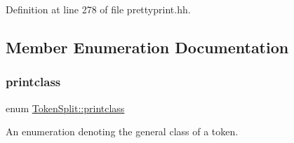Definition at line 278 of file prettyprint.\+hh.



\subsection{Member Enumeration Documentation}
\mbox{\label{class_token_split_a995222ab6b324567b96a04b69e9bca27}} 
\subsubsection{\texorpdfstring{printclass}{printclass}}
{\footnotesize\ttfamily enum \mbox{\hyperlink{class_token_split_a995222ab6b324567b96a04b69e9bca27}{Token\+Split\+::printclass}}}



An enumeration denoting the general class of a token. 

